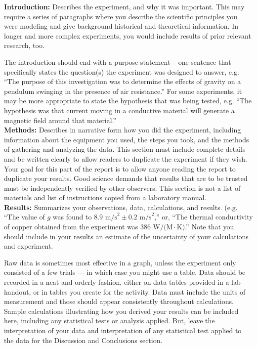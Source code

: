 \documentclass[11pt,letterpaper]{article}
\begin{document}
 
\textbf{Introduction:} Describes the experiment, and why it was important. This may require a series of paragraphs where you describe the scientific principles you were modeling and give background historical and theoretical information. In longer and more complex experiments, you would include results of prior relevant research, too. 

The introduction should end with a purpose statement-– one sentence that specifically states the question(s) the experiment was designed to answer, e.g. ``The purpose of this investigation was to determine the effects of gravity on a pendulum swinging in the presence of air resistance.''  For some experiments, it may be more appropriate to state the hypothesis that was being tested, e.g. ``The hypothesis was that current moving in a conductive material will generate a magnetic field around that material.''\\

 
\textbf{Methods:} Describes in narrative form how you did the experiment, including information about the equipment you used, the steps you took, and the methods of gathering and analyzing the data. This section must include complete details and be written clearly to allow readers to duplicate the experiment if they wish. Your goal for this part of the report is to allow anyone reading the report to duplicate your results. Good science demands that results that are to be trusted must be independently verified by other observers. This section is not a list of materials and list of instructions copied from a laboratory manual.\\

 
\textbf{Results:} Summarizes your observations, data, calculations, and results.  (e.g. ``The value of $g$ was found to $8.9\mbox{ m/s}^2 \pm 0.2\mbox{ m/s}^2$,''  or, ``The thermal conductivity of copper obtained from the experiment was $386\mbox{ W/(M}\cdot\mbox{K)}$.'' Note that you should include in your results an estimate of the uncertainty of your calculations and experiment.

Raw data is sometimes most effective in a graph, unless the experiment only consisted of a few trials --- in which case you might use a table. Data should be recorded in a neat and orderly fashion, either on data tables provided in a lab handout, or in tables you create for the activity. Data must include the units of measurement and those should appear consistently throughout calculations. Sample calculations illustrating how you derived your results can be included here, including any statistical tests or analysis applied. But, leave the interpretation of your data and interpretation of any statistical test applied to the data for the Discussion and Conclusions section. 
\end{document}

